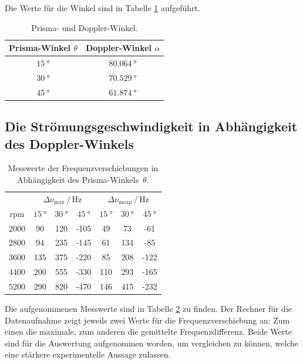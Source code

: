 Die Werte für die Winkel sind in Tabelle \ref{tab:Winkel} aufgeführt.
\begin{table}
    \centering
    \caption{Prisma- und Doppler-Winkel.}
    \label{tab:Winkel}
    \begin{tabular}{c c}
        \toprule
        Prisma-Winkel $\theta$ & Doppler-Winkel $\alpha$ \\
        \midrule
        $\SI{15}{\degree}$ & $\SI{80.064}{\degree}$ \\        
        $\SI{30}{\degree}$ & $\SI{70.529}{\degree}$ \\
        $\SI{45}{\degree}$ & $\SI{61.874}{\degree}$ \\        
        \bottomrule
    \end{tabular}
\end{table}

\subsection{Die Strömungsgeschwindigkeit in Abhängigkeit des Doppler-Winkels}

\begin{table}
    \centering
    \caption{Messwerte der Frequenzverschiebungen in Abhängigkeit des Prisma-Winkels~$\theta$.}
    \label{tab:1Mess}
    \begin{tabular}{c c c c c c c}
        \toprule
            & \multicolumn{3}{c}{$\Delta \nu_\text{max}\,/\,\si{\hertz}$} & \multicolumn{3}{c}{$\Delta \nu_\text{mean}\,/\,\si{\hertz}$} \\
        \cmidrule(lr){2-4} \cmidrule(lr){5-7}
        rpm & $\SI{15}{\degree}$ & $\SI{30}{\degree}$ & $\SI{45}{\degree}$ & $\SI{15}{\degree}$ & $\SI{30}{\degree}$ & $\SI{45}{\degree}$ \\
        \midrule
        2000 &  90 & 120 & -105 &  49 &  73 & -61  \\
        2800 &  94 & 235 & -145 &  61 & 134 & -85  \\
        3600 & 135 & 375 & -220 &  85 & 208 & -122 \\
        4400 & 200 & 555 & -330 & 110 & 293 & -165 \\
        5200 & 290 & 820 & -470 & 146 & 415 & -232 \\
        \bottomrule
    \end{tabular}
\end{table}

Die aufgenommenen Messwerte sind in Tabelle \ref{tab:1Mess} zu finden. 
Der Rechner für die Datenaufnahme zeigt jeweils zwei Werte für die Frequenzverschiebung an: Zum einen die maximale, zum 
anderen die gemittelte Frequenzdifferenz. 
Beide Werte sind für die Auswertung aufgenommen worden, um vergleichen zu können, welche eine stärkere experimentelle Aussage zulassen. 

